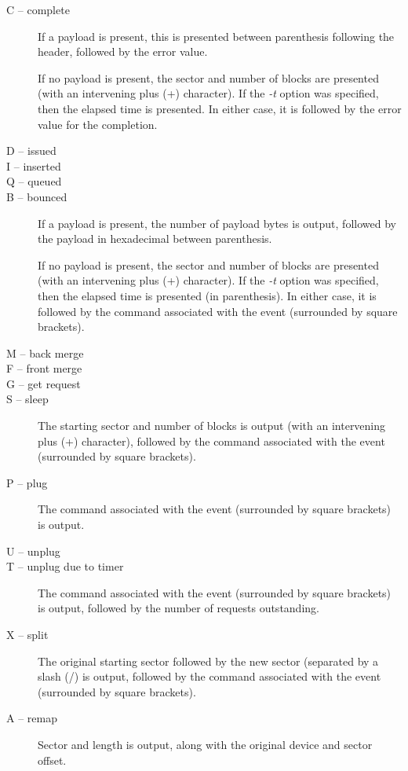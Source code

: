 \documentclass{article}
\begin{document}
\begin{description}
  \item[C -- complete] If a payload is present, this is presented between
  parenthesis following the header, followed by the error value. 

  If no payload is present, the sector and number of blocks are presented
  (with an intervening plus (+) character). If the \emph{-t} option
  was specified, then the elapsed time is presented. In either case,
  it is followed by the error value for the completion.

  \item[D -- issued]
  \item[I -- inserted]
  \item[Q -- queued]
  \item[B -- bounced] If a payload is present, the number of payload bytes
  is output, followed by the payload in hexadecimal between parenthesis.

  If no payload is present, the sector and number of blocks are presented
  (with an intervening plus (+) character). If the \emph{-t} option was
  specified, then the elapsed time is presented (in parenthesis). In
  either case, it is followed by the command associated with the event
  (surrounded by square brackets).

  \item[M -- back merge]
  \item[F -- front merge]
  \item[G -- get request]
  \item[S -- sleep] The starting sector and number of blocks is output
  (with an intervening plus (+) character), followed by the command
  associated with the event (surrounded by square brackets).

  \item[P -- plug] The command associated with the event (surrounded by
  square brackets) is output.

  \item[U -- unplug]
  \item[T -- unplug due to timer] The command associated with the event
  (surrounded by square brackets) is output, followed by the number of
  requests outstanding.

  \item[X -- split] The original starting sector followed by the new
  sector (separated by a slash (/) is output, followed by the command
  associated with the event (surrounded by square brackets).

  \item[A -- remap] Sector and length is output, along with the original
  device and sector offset.

\end{description}
\end{document}
